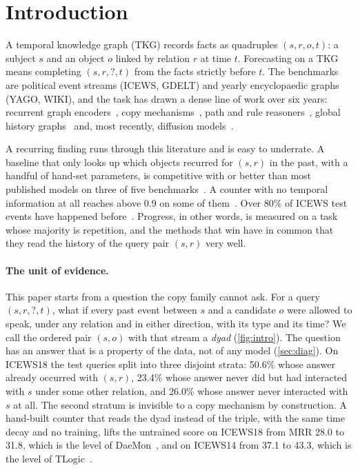 \section{Introduction}
\label{sec:intro}

A temporal knowledge graph (TKG) records facts as quadruples $(s, r, o, t)$: a subject $s$ and an object $o$ linked by relation $r$ at time $t$. Forecasting on a TKG means completing $(s, r, ?, t)$ from the facts strictly before $t$. The benchmarks are political event streams (ICEWS, GDELT) and yearly encyclopaedic graphs (YAGO, WIKI), and the task has drawn a dense line of work over six years: recurrent graph encoders~\cite{jin2020renet,li2021regcn,li2022cen,dong2025dimnet}, copy mechanisms~\cite{zhu2021cygnet,xu2023cenet}, path and rule reasoners~\cite{han2021xerte,sun2021titer,liu2022tlogic,dong2023daemon,dong2024tipnn,gastinger2026counttrucola}, global history graphs~\cite{li2022tirgn,chen2024logcl,chen2025cogntke} and, most recently, diffusion models~\cite{cai2024diffutkg,nadex2026}.

A recurring finding runs through this literature and is easy to underrate. A baseline that only looks up which objects recurred for $(s, r)$ in the past, with a handful of hand-set parameters, is competitive with or better than most published models on three of five benchmarks~\cite{gastinger2024history}. A counter with no temporal information at all reaches \hten{} above 0.9 on some of them~\cite{zhang2026evolution}. Over 80\% of ICEWS test events have happened before~\cite{strikingness2026}. Progress, in other words, is measured on a task whose majority is repetition, and the methods that win have in common that they read the history of the query pair $(s, r)$ very well.

\paragraph{The unit of evidence.} This paper starts from a question the copy family cannot ask. For a query $(s, r, ?, t)$, what if every past event between $s$ and a candidate $o$ were allowed to speak, under any relation and in either direction, with its type and its time? We call the ordered pair $(s, o)$ with that stream a \emph{dyad} (\cref{fig:intro}). The question has an answer that is a property of the data, not of any model (\cref{sec:diag}). On ICEWS18 the test queries split into three disjoint strata: 50.6\% whose answer already occurred with $(s, r)$, 23.4\% whose answer never did but had interacted with $s$ under some other relation, and 26.0\% whose answer never interacted with $s$ at all. The second stratum is invisible to a copy mechanism by construction. A hand-built counter that reads the dyad instead of the triple, with the same time decay and no training, lifts the untrained score on ICEWS18 from MRR 28.0 to 31.8, which is the level of DaeMon~\cite{dong2023daemon}, and on ICEWS14 from 37.1 to 43.3, which is the level of TLogic~\cite{liu2022tlogic}.

